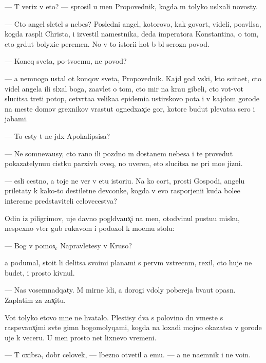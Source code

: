 \documentclass[10pt]{book}
\begin{document}
— T{\yi} verix v eto? — sprosil u men{\ia} Propovednik, kogda m{\yi} tolyko usl{\yi}xali novosty.

— Cto angel sletel s nebes? Posledni{\y} angel, kotorovo, kak govor{\ia}t, videli, po{\y}avl{\ia}lsa, kogda rasp{\ia}li Christa, i izvestil namestnika, deda imperatora Konstantina, o tom, cto gr{\ia}dut bolyxi{\y}e peremen{\yi}. No v to{\y} istori{\y}i hot{\ia} b{\yi} b{\yi}l ser{\y}ozn{\yi}{\y} povod.

— Koneq sveta, po-tvo{\y}emu, ne povod?

— {\Y}a nemnogo ustal ot konqov sveta, Propovednik. Kajd{\yi}{\y} god vs{\ia}ki{\y}, kto scita{\y}et, cto videl angela ili sl{\yi}xal boga, za{\y}avl{\ia}{\y}et o tom, cto mir na kra{\y}u gibeli, cto vot-vot slucitsa treti{\y} potop, cetv{\e}rta{\y}a velika{\y}a epidemi{\y}a {\y}ustirskovo pota i v kajdom gorode na meste domov grexnikov v{\yi}rastut ogned{\yi}xax̨i{\y}e gor{\yi}, kotor{\yi}{\y}e budut plevatsa sero{\y} i jabami.

— To {\y}esty t{\yi} ne jd{\e}x Apokalipsisa?

— Ne somneva{\y}usy, cto rano ili pozdno m{\yi} dostanem nebesa i te provedut pokazatelynu{\y}u cistku parxiv{\yi}h oveq, no uveren, eto slucitsa ne pri mo{\y}e{\y} jizni.

— {\Y}esli cestno, {\y}a toje ne ver{\iu} v etu istori{\y}u. Na ko{\y} cort, prosti Gospodi, angelu priletaty k kako{\y}-to des{\ia}tiletne{\y} devconke, kogda v {\y}evo raspor{\ia}jeni{\y}i kuda bole{\y}e interesn{\yi}{\y}e predstaviteli celovecestva?

Odin iz piligrimov, uje davno pogl{\ia}d{\yi}va{\y}ux̨i{\y} na men{\ia}, otodvinul pustu{\y}u misku, nespexno v{\yi}ter gub{\yi} rukavom i podoxol k mo{\y}emu stolu:

— Bog v pomox̨. Napravl{\ia}{\y}etesy v Kruso?

{\Y}a podumal, sto{\y}it li delitsa svo{\y}imi planami s perv{\yi}m vstrecn{\yi}m, rexil, cto huje ne budet, i prosto kivnul.

— Nas vosemnadqaty. M{\yi} mirn{\yi}{\y}e l{\iu}di, a dorogi vdoly poberej{\y}a b{\yi}va{\y}ut opasn{\yi}. Zaplatim za zax̨itu.

Vot tolyko etovo mne ne hvatalo. Plestisy dva s polovino{\y} dn{\ia} vmeste s raspeva{\y}ux̨imi sv{\ia}t{\yi}{\y}e gimn{\yi} bogomolyqami, kogda na loxadi mojno okazatsa v gorode uje k veceru. U men{\ia} prosto net lixnevo vremeni.

— T{\yi} oxibsa, dobr{\yi}{\y} celovek, — l{\iu}bezno otvetil {\y}a {\y}emu. — {\Y}a ne na{\y}emnik i ne vo{\y}in.
\end{document}
